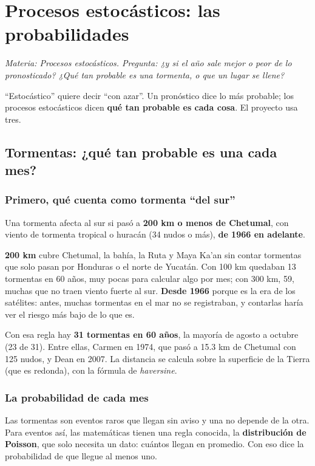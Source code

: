 \chapter{Procesos estocásticos: las probabilidades}
\label{cap:s-prob}
\textit{Materia: Procesos estocásticos. Pregunta: ¿y si el año sale mejor o peor de lo pronosticado? ¿Qué tan probable
es una tormenta, o que un lugar se llene?}

``Estocástico'' quiere decir ``con azar''. Un pronóstico dice lo más probable; los procesos estocásticos dicen
\textbf{qué tan probable es cada cosa}. El proyecto usa tres.

\section{Tormentas: ¿qué tan probable es una cada mes?}
\subsection{Primero, qué cuenta como tormenta ``del sur''}
Una tormenta afecta al sur si pasó a \textbf{200 km o menos de Chetumal}, con viento de tormenta tropical o huracán (34
nudos o más), \textbf{de 1966 en adelante}.

\begin{porque}
\textbf{200 km} cubre Chetumal, la bahía, la Ruta y Maya Ka'an sin contar tormentas que solo pasan por Honduras o el norte
de Yucatán. Con 100 km quedaban 13 tormentas en 60 años, muy pocas para calcular algo por mes; con 300 km, 59, muchas que
no traen viento fuerte al sur. \textbf{Desde 1966} porque es la era de los satélites: antes, muchas tormentas en el mar no
se registraban, y contarlas haría ver el riesgo más bajo de lo que es.
\end{porque}

Con esa regla hay \textbf{31 tormentas en 60 años}, la mayoría de agosto a octubre (23 de 31). Entre ellas, Carmen en 1974,
que pasó a 15.3 km de Chetumal con 125 nudos, y Dean en 2007. La distancia se calcula sobre la superficie de la Tierra (que
es redonda), con la fórmula de \emph{haversine}.

\subsection{La probabilidad de cada mes}
\begin{intuicion}
Las tormentas son eventos raros que llegan sin aviso y una no depende de la otra. Para eventos así, las matemáticas tienen
una regla conocida, la \textbf{distribución de Poisson}, que solo necesita un dato: cuántos llegan en promedio. Con eso
dice la probabilidad de que llegue al menos uno.
\end{intuicion}

